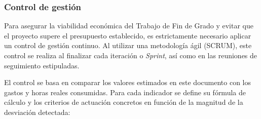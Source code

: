 \documentclass[11pt, letterpaper]{article}
\begin{document}
\subsubsection{Control de gestión}
\label{sec:control_gestion}
Para asegurar la viabilidad económica del Trabajo de Fin de Grado y evitar que el proyecto supere el presupuesto establecido, es estrictamente necesario aplicar un control de gestión continuo. Al utilizar una metodología ágil (SCRUM), este control se realiza al finalizar cada iteración o \textit{Sprint}, así como en las reuniones de seguimiento estipuladas.

El control se basa en comparar los valores estimados en este documento con los gastos y horas reales consumidas. Para cada indicador se define su fórmula de cálculo y los criterios de actuación concretos en función de la magnitud de la desviación detectada:
\end{document}
